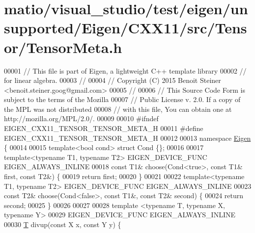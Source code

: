 \hypertarget{matio_2visual__studio_2test_2eigen_2unsupported_2_eigen_2_c_x_x11_2src_2_tensor_2_tensor_meta_8h_source}{}\section{matio/visual\+\_\+studio/test/eigen/unsupported/\+Eigen/\+C\+X\+X11/src/\+Tensor/\+Tensor\+Meta.h}
\label{matio_2visual__studio_2test_2eigen_2unsupported_2_eigen_2_c_x_x11_2src_2_tensor_2_tensor_meta_8h_source}

\begin{DoxyCode}
00001 \textcolor{comment}{// This file is part of Eigen, a lightweight C++ template library}
00002 \textcolor{comment}{// for linear algebra.}
00003 \textcolor{comment}{//}
00004 \textcolor{comment}{// Copyright (C) 2015 Benoit Steiner <benoit.steiner.goog@gmail.com>}
00005 \textcolor{comment}{//}
00006 \textcolor{comment}{// This Source Code Form is subject to the terms of the Mozilla}
00007 \textcolor{comment}{// Public License v. 2.0. If a copy of the MPL was not distributed}
00008 \textcolor{comment}{// with this file, You can obtain one at http://mozilla.org/MPL/2.0/.}
00009 
00010 \textcolor{preprocessor}{#ifndef EIGEN\_CXX11\_TENSOR\_TENSOR\_META\_H}
00011 \textcolor{preprocessor}{#define EIGEN\_CXX11\_TENSOR\_TENSOR\_META\_H}
00012 
00013 \textcolor{keyword}{namespace }\hyperlink{namespace_eigen}{Eigen} \{
00014 
00015 \textcolor{keyword}{template}<\textcolor{keywordtype}{bool} cond> \textcolor{keyword}{struct }Cond \{\};
00016 
00017 \textcolor{keyword}{template}<\textcolor{keyword}{typename} T1, \textcolor{keyword}{typename} T2> EIGEN\_DEVICE\_FUNC EIGEN\_ALWAYS\_INLINE
00018 \textcolor{keyword}{const} T1& choose(Cond<true>, \textcolor{keyword}{const} T1& first, \textcolor{keyword}{const} T2&) \{
00019   \textcolor{keywordflow}{return} first;
00020 \}
00021 
00022 \textcolor{keyword}{template}<\textcolor{keyword}{typename} T1, \textcolor{keyword}{typename} T2> EIGEN\_DEVICE\_FUNC EIGEN\_ALWAYS\_INLINE
00023 \textcolor{keyword}{const} T2& choose(Cond<false>, \textcolor{keyword}{const} T1&, \textcolor{keyword}{const} T2& second) \{
00024   \textcolor{keywordflow}{return} second;
00025 \}
00026 
00027 
00028 \textcolor{keyword}{template} <\textcolor{keyword}{typename} T, \textcolor{keyword}{typename} X, \textcolor{keyword}{typename} Y>
00029 EIGEN\_DEVICE\_FUNC EIGEN\_ALWAYS\_INLINE
00030 \hyperlink{group___sparse_core___module_class_eigen_1_1_triplet}{T} divup(\textcolor{keyword}{const} X x, \textcolor{keyword}{const} Y y) \{

\end{DoxyCode}
